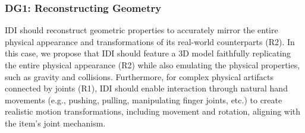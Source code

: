 






\subsubsection{\textbf{DG1: Reconstructing Geometry}}
IDI should reconstruct geometric properties to accurately mirror the entire physical appearance and transformations of its real-world counterparts (R2). 
In this case, we propose that IDI should feature a 3D model faithfully replicating the entire physical appearance (R2) while also emulating the physical properties, such as gravity and collisions. 
Furthermore, for complex physical artifacts connected by joints (R1), IDI should enable interaction through natural hand movements (e.g., pushing, pulling, manipulating finger joints, etc.) to create realistic motion transformations, including movement and rotation, aligning with the item’s joint mechanism.



